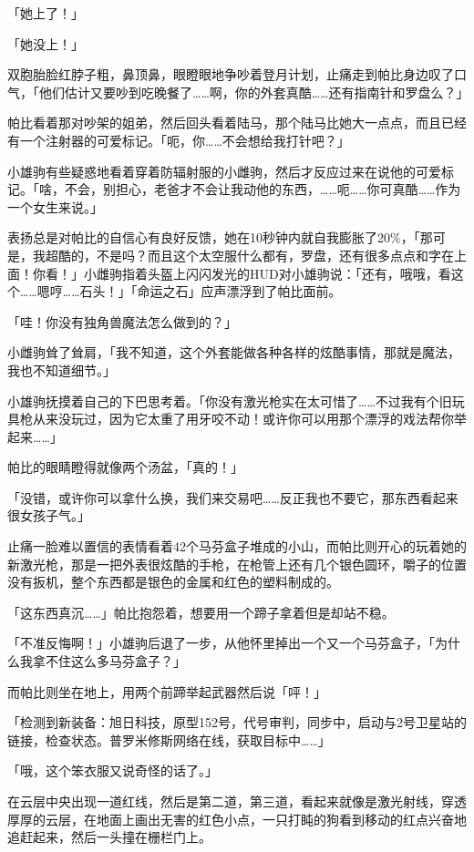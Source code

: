 「她上了！」

「她没上！」

双胞胎脸红脖子粗，鼻顶鼻，眼瞪眼地争吵着登月计划，止痛走到帕比身边叹了口气，「他们估计又要吵到吃晚餐了……啊，你的外套真酷……还有指南针和罗盘么？」

帕比看着那对吵架的姐弟，然后回头看着陆马，那个陆马比她大一点点，而且已经有一个注射器的可爱标记。「呃，你……不会想给我打针吧？」

小雄驹有些疑惑地看着穿着防辐射服的小雌驹，然后才反应过来在说他的可爱标记。「啥，不会，别担心，老爸才不会让我动他的东西，……呃……你可真酷……作为一个女生来说。」

表扬总是对帕比的自信心有良好反馈，她在10秒钟内就自我膨胀了20\%，「那可是，我超酷的，不是吗？而且这个太空服什么都有，罗盘，还有很多点点和字在上面！你看！」小雌驹指着头盔上闪闪发光的HUD对小雄驹说：「还有，哦哦，看这个……嗯哼……石头！」「命运之石」应声漂浮到了帕比面前。

「哇！你没有独角兽魔法怎么做到的？」

小雌驹耸了耸肩，「我不知道，这个外套能做各种各样的炫酷事情，那就是魔法，我也不知道细节。」

小雄驹抚摸着自己的下巴思考着。「你没有激光枪实在太可惜了……不过我有个旧玩具枪从来没玩过，因为它太重了用牙咬不动！或许你可以用那个漂浮的戏法帮你举起来……」

帕比的眼睛瞪得就像两个汤盆，「真的！」

「没错，或许你可以拿什么换，我们来交易吧……反正我也不要它，那东西看起来很女孩子气。」

\horizonline


止痛一脸难以置信的表情看着42个马芬盒子堆成的小山，而帕比则开心的玩着她的新激光枪，那是一把外表很炫酷的手枪，在枪管上还有几个银色圆环，嚼子的位置没有扳机，整个东西都是银色的金属和红色的塑料制成的。

「这东西真沉……」帕比抱怨着，想要用一个蹄子拿着但是却站不稳。

「不准反悔啊！」小雄驹后退了一步，从他怀里掉出一个又一个马芬盒子，「为什么我拿不住这么多马芬盒子？」

而帕比则坐在地上，用两个前蹄举起武器然后说「呯！」

「{\mt 检测到新装备：旭日科技，原型152号，代号审判，同步中，启动与2号卫星站的链接，检查状态。普罗米修斯网络在线，获取目标中……}」

「哦，这个笨衣服又说奇怪的话了。」

在云层中央出现一道红线，然后是第二道，第三道，看起来就像是激光射线，穿透厚厚的云层，在地面上画出无害的红色小点，一只打盹的狗看到移动的红点兴奋地追赶起来，然后一头撞在栅栏门上。

